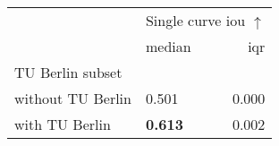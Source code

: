 \begin{tabular}{llr}
\toprule
 & \multicolumn{2}{c}{Single curve \acrshort{iou} $\uparrow$} \\
 & median & \acrshort{iqr} \\
TU Berlin subset &  &  \\
\midrule
without TU Berlin & 0.501 & 0.000 \\
with TU Berlin & \textbf{0.613} & 0.002 \\
\bottomrule
\end{tabular}
